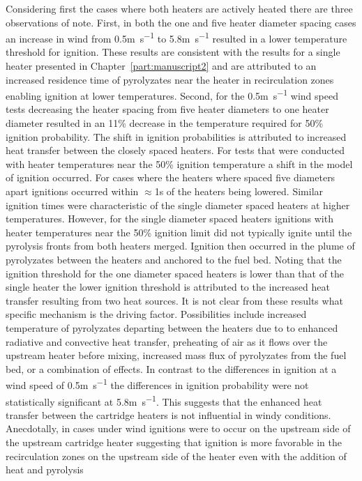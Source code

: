     Considering first the cases where both heaters are actively heated there are three observations of note. First, in both the one and five heater diameter spacing cases an increase in wind from 0.5\si{\meter\per\second} to 5.8\si{\meter\per\second} resulted in a lower temperature threshold for ignition. These results are consistent with the results for a single heater presented in Chapter~\ref{part:manuscript2} and are attributed to an increased residence time of pyrolyzates near the heater in recirculation zones enabling ignition at lower temperatures. Second, for the 0.5\si{\meter\per\second} wind speed tests decreasing the heater spacing from five heater diameters to one heater diameter resulted in an 11\% decrease in the temperature required for 50\% ignition probability. The shift in ignition probabilities is attributed to increased heat transfer between the closely spaced heaters. For tests that were conducted with heater temperatures near the 50\% ignition temperature a shift in the model of ignition occurred. For cases where the heaters where spaced five diameters apart ignitions occurred within $\approx$1\si{\second} of the heaters being lowered. Similar ignition times were characteristic of the single diameter spaced heaters at higher temperatures. However, for the single diameter spaced heaters ignitions with heater temperatures near the 50\% ignition limit did not typically ignite until the pyrolysis fronts from both heaters merged. Ignition then occurred in the plume of pyrolyzates between the heaters and anchored to the fuel bed. Noting that the ignition threshold for the one diameter spaced heaters is lower than that of the single heater the lower ignition threshold is attributed to the increased heat transfer resulting from two heat sources. It is not clear from these results what specific mechanism is the driving factor. Possibilities include increased temperature of pyrolyzates departing between the heaters due to to enhanced radiative and convective heat transfer, preheating of air as it flows over the upstream heater before mixing, increased mass flux of pyrolyzates from the fuel bed, or a combination of effects. In contrast to the differences in ignition at a wind speed of 0.5\si{\meter\per\second} the differences in ignition probability were not statistically significant at 5.8\si{\meter\per\second}. This suggests that the enhanced heat transfer between the cartridge heaters is not influential in windy conditions. Anecdotally, in cases under wind ignitions were to occur on the upstream side of the upstream cartridge heater suggesting that ignition is more favorable in the recirculation zones on the upstream side of the heater even with the addition of heat and pyrolysis 
   
